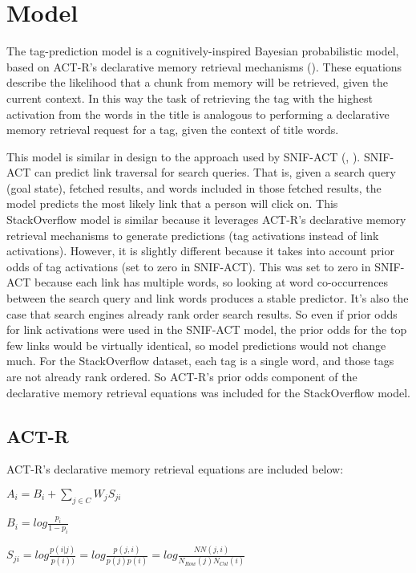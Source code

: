 \documentclass[10pt,letterpaper]{article}
\begin{document}
\section{Model}

The tag-prediction model is a cognitively-inspired Bayesian probabilistic model, based on ACT-R's declarative memory retrieval mechanisms (\cite{Anderson2004}).
These equations describe the likelihood that a chunk from memory will be retrieved, given the current context.
In this way the task of retrieving the tag with the highest activation from the words in the title is analogous to performing a declarative memory retrieval request for a tag, given the context of title words.

This model is similar in design to the approach used by SNIF-ACT (\cite{Fu2007}, \cite{Pirolli2003}). 
SNIF-ACT can predict link traversal for search queries.
That is, given a search query (goal state), fetched results, and words included in those fetched results, the model predicts the most likely link that a person will click on.
This StackOverflow model is similar because it leverages ACT-R's declarative memory retrieval mechanisms to generate predictions (tag activations instead of link activations).
However, it is slightly different because it takes into account prior odds of tag activations (set to zero in SNIF-ACT).
This was set to zero in SNIF-ACT because each link has multiple words, so looking at word co-occurrences between the search query and link words produces a stable predictor.
It's also the case that search engines already rank order search results.
So even if prior odds for link activations were used in the SNIF-ACT model, the prior odds for the top few links would be virtually identical, so model predictions would not change much.
For the StackOverflow dataset, each tag is a single word, and those tags are not already rank ordered.
So ACT-R's prior odds component of the declarative memory retrieval equations was included for the StackOverflow model.

\subsection{ACT-R}

ACT-R's declarative memory retrieval equations are included below:

$A_{i} = B_{i} + \sum_{j\in C}^{ } W_{j} S_{ji}$

$B_{i} = log \frac{p_{i}}{1-p_{i}}$

$S_{ji} = log \frac{p(i|j)}{p(i))} = log \frac{p(j,i)}{p(j)p(i)} = log \frac{NN(j,i)}{N_{Row}(j)N_{Col}(i)}$
\end{document}
